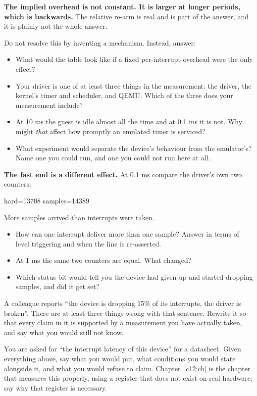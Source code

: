 \noindent \textbf{The implied overhead is not constant. It is larger at longer periods, which is
backwards.} The relative re-arm is real and is part of the answer, and it is plainly not the whole
answer.

Do not resolve this by inventing a mechanism. Instead, answer:
\begin{itemize}
  \item What would the table look like if a fixed per-interrupt overhead were the only effect?
  \item Your driver is one of at least three things in the measurement: the driver, the kernel's
    timer and scheduler, and QEMU. Which of the three does your  measurement
    include?
  \item At 10 ms the guest is idle almost all the time and at 0.1 ms it is not. Why might
    \emph{that} affect how promptly an emulated timer is serviced?
  \item What experiment would separate the device's behaviour from the emulator's? Name one you
    could run, and one you could not run here at all.
\end{itemize}

 \textbf{The fast end is a different effect.} At 0.1 ms compare the driver's own two
counters:

\begin{console}
hard=13708  samples=14389
\end{console}

\noindent More samples arrived than interrupts were taken.
\begin{itemize}
  \item How can one interrupt deliver more than one sample? Answer in terms of level triggering and
    when the line is re-asserted.
  \item At 1 ms the same two counters are equal. What changed?
  \item Which status bit would tell you the device had given up and started dropping samples, and
    did it get set?
\end{itemize}

 A colleague reports ``the device is dropping 15\% of its interrupts, the driver is
broken''. There are at least three things wrong with that sentence. Rewrite it so that every claim
in it is supported by a measurement you have actually taken, and say what you would still not know.

 You are asked for ``the interrupt latency of this device'' for a datasheet. Given
everything above, say what you would put, what conditions you would state alongside it, and what you
would refuse to claim. Chapter~\ref{c12:ch} is the chapter that measures this properly, using a
register that does not exist on real hardware; say why that register is necessary.
